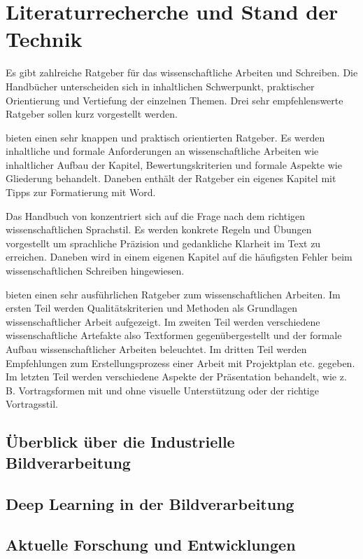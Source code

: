 \chapter{Literaturrecherche und Stand der Technik}\label{sec:stand_der_technik}

Es gibt zahlreiche Ratgeber für das wissenschaftliche Arbeiten und Schreiben. Die Handbücher unterscheiden sich in inhaltlichen Schwerpunkt, praktischer Orientierung und Vertiefung der einzelnen Themen. Drei sehr empfehlenswerte Ratgeber sollen kurz vorgestellt werden.

\cite{karmasin2012gestaltung} bieten einen sehr knappen und praktisch orientierten Ratgeber. Es werden inhaltliche und formale Anforderungen an wissenschaftliche Arbeiten wie inhaltlicher Aufbau der Kapitel, Bewertungskriterien und formale Aspekte wie Gliederung behandelt. Daneben enthält der Ratgeber ein eigenes Kapitel mit Tipps zur Formatierung mit Word.

Das Handbuch von \cite{esselborn2012richtig} konzentriert sich auf die Frage nach dem richtigen wissenschaftlichen Sprachstil. Es werden konkrete Regeln und Übungen vorgestellt um sprachliche Präzision und gedankliche Klarheit im Text zu erreichen. Daneben wird in einem eigenen Kapitel auf die häufigsten Fehler beim wissenschaftlichen Schreiben hingewiesen.

\cite{balzert2011wissenschaftliches} bieten einen sehr ausführlichen Ratgeber zum wissenschaftlichen Arbeiten. Im ersten Teil werden Qualitätskriterien und Methoden als Grundlagen wissenschaftlicher Arbeit aufgezeigt. Im zweiten Teil werden verschiedene wissenschaftliche Artefakte also Textformen gegenübergestellt und der formale Aufbau wissenschaftlicher Arbeiten beleuchtet. Im dritten Teil werden Empfehlungen zum Erstellungsprozess einer Arbeit mit Projektplan etc. gegeben. Im letzten Teil werden verschiedene Aspekte der Präsentation behandelt, wie z. B. Vortragsformen mit und ohne visuelle Unterstützung oder der richtige Vortragsstil.

\section{Überblick über die Industrielle Bildverarbeitung}

\section{Deep Learning in der Bildverarbeitung}

\section{Aktuelle Forschung und Entwicklungen}

